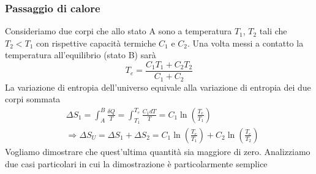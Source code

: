 \documentclass[10pt,a4paper]{article}
\begin{document}
\subsubsection*{Passaggio di calore}
Consideriamo due corpi che allo stato A sono a temperatura \(T_1\), \(T_2\) tali che \(T_2<T_1\)  con rispettive capacità termiche \(C_1\) e \(C_2\). Una volta messi a contatto la temperatura all'equilibrio (stato B) sarà
\[T_e=\frac{C_1T_1 + C_2T_2}{C_1+C_2}\]
La variazione di entropia dell'universo equivale alla variazione di entropia dei due corpi sommata
\begin{align*}
	&\Delta S_1 = \int_{A}^{B}\frac{\delta Q}{T} = \int_{T_1}^{T_e}\frac{C_1 dT}{T}=C_1 \ln\left(\frac{T_e}{T_1}\right)\\
	&\Rightarrow \Delta S_U = \Delta S_1 + \Delta S_2 = C_1 \ln\left(\frac{T_e}{T_1}\right) + C_2 \ln\left(\frac{T_e}{T_2}\right)
\end{align*}
Vogliamo dimostrare che quest'ultima quantità sia maggiore di zero. Analizziamo due casi particolari in cui la dimostrazione è particolarmente semplice
\end{document}
